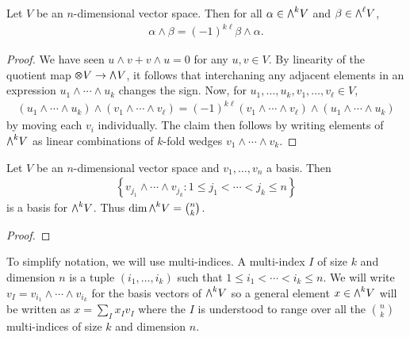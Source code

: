 \documentclass{article}
\begin{document}
\begin{lemma}
  Let $V$ be an $n$-dimensional vector space.
  Then for all $\alpha\in\exterior{k}{V}$ and $\beta\in\exterior{\ell}{V}$,
  \begin{align*}
    \alpha\wedge\beta = (-1)^{k\ell}\beta\wedge\alpha.
  \end{align*}
  \begin{proof}
    We have seen $u\wedge v + v\wedge u = 0$ for any $u,v\in V$.
    By linearity of the quotient map $\tensor{}{V}\to\exterior{}{V}$,
    it follows that interchaning any adjacent elements in an expression
    $u_1\wedge\cdots\wedge u_k$ changes the sign. Now,
    for $u_1,\ldots,u_k,v_1,\ldots,v_\ell\in V$,
    \begin{align*}
      (u_1\wedge\cdots\wedge u_k)\wedge(v_1\wedge\cdots\wedge v_\ell)
      = (-1)^{k\ell}(v_1\wedge\cdots\wedge v_\ell)\wedge(u_1\wedge\cdots\wedge u_k)
    \end{align*}
    by moving each $v_i$ individually. The claim then follows
    by writing elements of $\exterior{k}{V}$ as linear combinations
    of $k$-fold wedges $v_1\wedge\cdots\wedge v_k$.
  \end{proof}
\end{lemma}

\begin{lemma}\label{lem:basis_of_exterior_product}
  Let $V$ be an $n$-dimensional vector space and $v_1,\ldots,v_n$ a basis.
  Then
  \begin{align*}
    \left\lbrace{v_{j_1}\wedge\cdots\wedge v_{j_k} : 1\leq j_1<\cdots<j_k\leq n }\right\rbrace
  \end{align*}
  is a basis for $\exterior{k}{V}$. Thus $\dim\exterior{k}{V} = \binom{n}{k}$.
  \begin{proof}
  \end{proof}
\end{lemma}

To simplify notation, we will use multi-indices. A multi-index $I$ of size
$k$ and dimension $n$ is a tuple $(i_1,\ldots,i_k)$ such that
$1\leq i_1<\cdots<i_k\leq n$. We will write $v_I = v_{i_1}\wedge \cdots \wedge
v_{i_k}$ for the basis vectors of $\exterior{k}{V}$ so a general
element $x\in\exterior{k}{V}$ will be written as
$x = \sum_I x_I v_I$ where the $I$ is understood to range over
all the $\binom{n}{k}$ multi-indices of size $k$ and dimension $n$.
\end{document}
